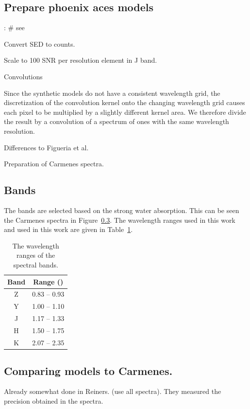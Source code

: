 \subsection{Prepare phoenix aces models}:
\# see~\citet{figueira_radial_2016}

Convert SED to counts.


Scale to 100 SNR per resolution element in J band.

Convolutions


Since the synthetic models do not have a consistent wavelength grid, the discretization of the convolution kernel onto the changing wavelength grid causes each pixel to be multiplied by a slightly different kernel area. We therefore divide the result by a convolution of a spectrum of ones with the same wavelength resolution.

Differences to Figueria et al.


Preparation of Carmenes spectra.



\subsection{Bands}
The bands are selected based on the strong water absorption. This can be seen the Carmenes spectra in Figure~\ref{}. The wavelength ranges used in this work~\citet{figueira_radial_2016} and used in this work are given in Table~\ref{tab:band_ranges}.
\begin{table}
    \centering
    \caption{The wavelength ranges of the \nir{} spectral bands.}
    \begin{tabular}{cc}
        \toprule
        Band & Range (\um{})\\
        \midrule
        Z & 0.83 -- 0.93\\
        Y & 1.00 -- 1.10\\
        J & 1.17 -- 1.33\\
        H & 1.50 -- 1.75\\
        K & 2.07 -- 2.35\\
        \bottomrule
    \end{tabular}
    \label{tab:band_ranges}
\end{table}



\subsection{Comparing models to Carmenes.}
Already somewhat done in Reiners. (use all spectra). They measured the precision obtained in the spectra.

